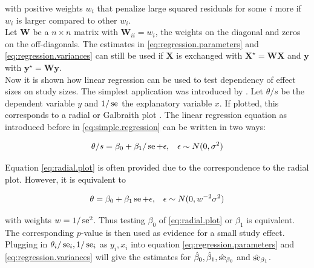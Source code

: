 \documentclass[11pt,a4paper,twoside]{book}\usepackage[]{graphicx}\usepackage[]{color}
\begin{document}
with positive weights $w_i$ that penalize large squared residuals for some $i$ more if $w_i$ is larger compared to other $w_i$. \\
Let $\mathbf{W}$ be a $n \times n$ matrix with $\mathbf{W}_{ii} = w_i$, the weights on the diagonal and zeros on the off-diagonals. The estimates in \ref{eq:regression.parameters} and \ref{eq:regression.variances} can still be used if $\mathbf{X}$ is exchanged with $\mathbf{X}^\star =  \mathbf{W} \mathbf{X}$ and $\mathbf{y}$ with $\mathbf{y}^\star = \mathbf{W} \mathbf{y}$. \label{weighted.regression} \\
Now it is shown how linear regression can be used to test dependency of effect sizes on study sizes. The simplest application was introduced by \citet{Egger}.
Let $\theta/s$ be the dependent variable $y$ and $1/\operatorname{se}$ the explanatory variable $x$. If plotted, this corresponds to a radial or Galbraith plot \citep{galbraith}. The linear regression equation as introduced before in \ref{eq:simple.regression} can be written in two ways:

\begin{align}
\theta/s &= \beta_0 + \beta_1/\operatorname{se} + \epsilon, & \epsilon \sim N(0, \sigma^2) \label{eq:radial.plot} 
\end{align}

Equation \eqref{eq:radial.plot} is often provided due to the correspondence to the radial plot. However, it is equivalent to

\begin{align}
\theta &= \beta_0 + \beta_1 \operatorname{se} + \epsilon, & \epsilon \sim N(0, w^{-2}\sigma^2) \label{eq:egger.plot}
\end{align}

with weights $w = 1/\operatorname{se}^2$. Thus testing $\beta_0$ of \ref{eq:radial.plot} or $\beta_1$ is equivalent. The corresponding $p$-value is then used as evidence for a small study effect. Plugging in  $\theta_i/\operatorname{se}_i, 1/\operatorname{se}_i$ as $y_i, x_i$ into equation \ref{eq:regression.parameters} and \ref{eq:regression.variances} will give the estimates for $\hat{\beta}_0, \hat{\beta}_1,\hat{\operatorname{se}}_{\beta_0}$ and $\hat{\operatorname{se}}_{\beta_1}$.

\end{document}
